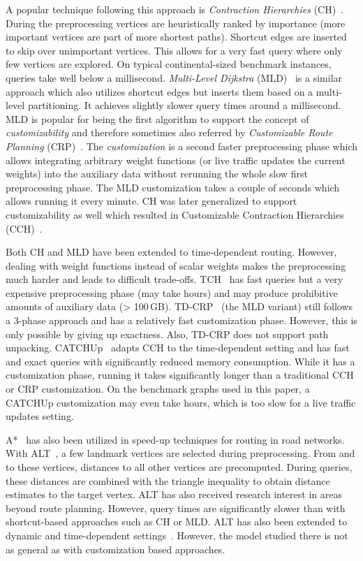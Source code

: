 \documentclass[a4paper,UKenglish,cleveref, autoref, thm-restate,anonymous]{lipics-v2021}
\begin{document}
A popular technique following this approach is \emph{Contraction Hierarchies} (CH)~\cite{gssv-erlrn-12}.
During the preprocessing vertices are heuristically ranked by importance (more important vertices are part of more shortest paths).
Shortcut edges are inserted to skip over unimportant vertices.
This allows for a very fast query where only few vertices are explored.
On typical continental-sized benchmark instances, queries take well below a millisecond.
\emph{Multi-Level Dijkstra} (MLD)~\cite{swz-umlgt-02} is a similar approach which also utilizes shortcut edges but inserts them based on a multi-level partitioning.
It achieves slightly slower query times around a millisecond.
MLD is popular for being the first algorithm to support the concept of \emph{customizability} and therefore sometimes also referred by \emph{Customizable Route Planning} (CRP)~\cite{dgpw-crprn-13}.
The \emph{customization} is a second faster preprocessing phase which allows integrating arbitrary weight functions (or live traffic updates the current weights) into the auxiliary data without rerunning the whole slow first preprocessing phase.
The MLD customization takes a couple of seconds which allows running it every minute.
CH was later generalized to support customizability as well which resulted in Customizable Contraction Hierarchies (CCH)~\cite{dsw-cch-15}.

Both CH and MLD have been extended to time-dependent routing.
However, dealing with weight functions instead of scalar weights makes the preprocessing much harder and leads to difficult trade-offs.
TCH~\cite{bgsv-mtdtt-13} has fast queries but a very expensive preprocessing phase (may take hours) and may produce prohibitive amounts of auxiliary data (> 100\,GB).
TD-CRP~\cite{bdpw-dtdrp-16} (the MLD variant) still follows a 3-phase approach and has a relatively fast customization phase.
However, this is only possible by giving up exactness.
Also, TD-CRP does not support path unpacking.
CATCHUp~\cite{swz-sfert-21} adapts CCH to the time-dependent setting and has fast and exact queries with significantly reduced memory consumption.
While it has a customization phase, running it takes significantly longer than a traditional CCH or CRP customization.
On the benchmark graphs used in this paper, a CATCHUp customization may even take hours, which is too slow for a live traffic updates setting.

A*~\cite{hnr-afbhd-68} has also been utilized in speed-up techniques for routing in road networks.
With ALT~\cite{gh-cspas-05,gw-cppsp-05}, a few landmark vertices are selected during preprocessing.
From and to these vertices, distances to all other vertices are precomputed.
During queries, these distances are combined with the triangle inequality to obtain distance estimates to the target vertex.
ALT has also received research interest in areas beyond route planning.
However, query times are significantly slower than with shortcut-based approaches such as CH or MLD.
ALT has also been extended to dynamic and time-dependent settings~\cite{dn-crdtd-12}. %
However, the model studied there is not as general as with customization based approaches.
\end{document}
